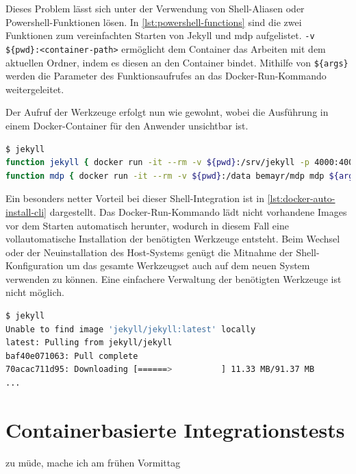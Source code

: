 Dieses Problem lässt sich unter der Verwendung von Shell-Aliasen oder Powershell-Funktionen lösen.
In \cref{lst:powershell-functions} sind die zwei Funktionen zum vereinfachten Starten von Jekyll und mdp aufgelistet.
\texttt{-v \$\{pwd\}:<container-path>} ermöglicht dem Container das Arbeiten mit dem aktuellen Ordner, indem es diesen an den Container bindet.
Mithilfe von \texttt{\$\{args\}} werden die Parameter des Funktionsaufrufes an das Docker-Run-Kommando weitergeleitet.

Der Aufruf der Werkzeuge erfolgt nun wie gewohnt, wobei die Ausführung in einem Docker-Container für den Anwender unsichtbar ist.

\begin{lstlisting}[caption=Powershell-Funktionen für Docker-Kommandos, language=bash, label=lst:powershell-functions]
$ jekyll
function jekyll { docker run -it --rm -v ${pwd}:/srv/jekyll -p 4000:4000 jekyll/jekyll /usr/local/bin/jekyll ${args} }
function mdp { docker run -it --rm -v ${pwd}:/data bemayr/mdp mdp ${args} }
\end{lstlisting}
Ein besonders netter Vorteil bei dieser Shell-Integration ist in \cref{lst:docker-auto-install-cli} dargestellt.
Das Docker-Run-Kommando lädt nicht vorhandene Images vor dem Starten automatisch herunter, wodurch in diesem Fall eine vollautomatische Installation der benötigten Werkzeuge entsteht.
Beim Wechsel oder der Neuinstallation des Host-Systems genügt die Mitnahme der Shell-Konfiguration um das gesamte Werkzeugset auch auf dem neuen System verwenden zu können.
Eine einfachere Verwaltung der benötigten Werkzeuge ist nicht möglich.

\begin{lstlisting}[caption=Automatische Installation der Docker-basierten CLI-Anwendungen, language=bash, label=lst:docker-auto-install-cli]
$ jekyll
Unable to find image 'jekyll/jekyll:latest' locally
latest: Pulling from jekyll/jekyll
baf40e071063: Pull complete
70acac711d95: Downloading [======>          ] 11.33 MB/91.37 MB
...
\end{lstlisting}

\section{Containerbasierte Integrationstests}
\label{sec:containerbasiertes-integrationstests}
zu müde, mache ich am frühen Vormittag

